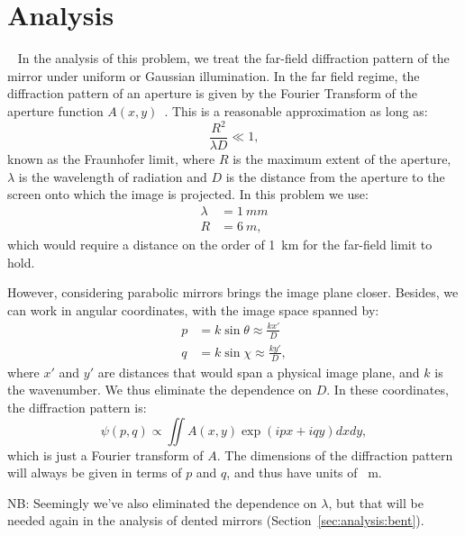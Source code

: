 \documentclass{article}
\begin{document}
\section{Analysis}~\label{sec:analysis}
In the analysis of this problem, we treat the far-field diffraction pattern of the mirror under uniform or Gaussian illumination. In the far field regime, the diffraction pattern of an aperture is given by the Fourier Transform of the aperture function \( A(x,y) \)~\cite[Chapter 10.2]{hecht}. This is a reasonable approximation as long as:
\begin{equation}\label{eqn:fraunhofer}
    \frac{R^2}{\lambda D} \ll 1,
\end{equation}
known as the Fraunhofer limit, where $R$ is the maximum extent of the aperture, $\lambda$ is the wavelength of radiation and $D$ is the distance from the aperture to the screen onto which the image is projected. In this problem we use:
\begin{align*}
    \lambda &= \SI{1}{mm} \\
    R &= \SI{6}{m},
\end{align*}
which would require a distance on the order of \SI{1}{km} for the far-field limit to hold. 

However, considering parabolic mirrors brings the image plane closer. Besides, we can work in angular coordinates, with the image space spanned by:
\begin{align*}
    p &= k \sin{\theta} \approx \frac{k x'}{D} \\
    q &= k \sin{\chi} \approx \frac{k y'}{D},
\end{align*}
where $x'$ and $y'$ are distances that would span a physical image plane, and $k$ is the wavenumber. We thus eliminate the dependence on $D$. In these coordinates, the diffraction pattern is:
\begin{equation}\label{eqn:diff}
    \psi(p, q) \propto \iint A(x, y) \exp \left( ipx + iqy \right) dx dy,
\end{equation}
which is just a Fourier transform of $A$. The dimensions of the diffraction pattern will always be given in terms of $p$ and $q$, and thus have units of \si{\per\metre}.

NB: Seemingly we've also eliminated the dependence on $\lambda$, but that will be needed again in the analysis of dented mirrors (Section~\ref{sec:analysis:bent}).
\end{document}
